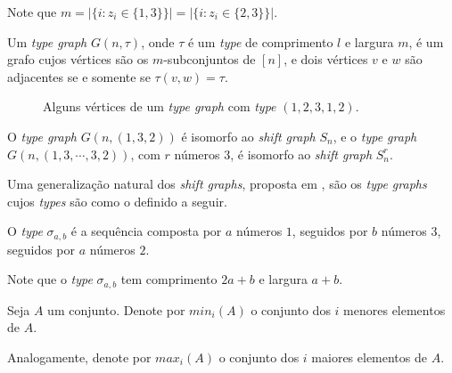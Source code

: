 Note que $m = |\{i : z_i \in \{1,3\}\}| = |\{i : z_i \in \{2,3\}\}|$.

\begin{definicao}
Um \textit{type graph} $G(n,\tau)$, onde $\tau$ é um \textit{type} de comprimento $l$ e largura $m$, é um grafo cujos vértices são os $m$-subconjuntos de $[n]$, e dois vértices $v$ e $w$ são adjacentes se e somente se $\tau(v,w) = \tau$.
\end{definicao}

\begin{figure}[H]
\centering
{}
\caption{Alguns vértices de um \textit{type graph} com \textit{type} $(1,2,3,1,2).$}
\label{fig:typegraphexample}
\end{figure}

O \textit{type graph} $G(n,(1,3,2))$ é isomorfo ao \textit{shift graph} $S_n$, e o \textit{type graph} $G(n, (1,3,\cdots,3,2))$, com $r$ números $3$, é isomorfo ao \textit{shift graph} $S_n^r$.

Uma generalização natural dos \textit{shift graphs}, proposta em \cite{avart2014generalized}, são os \textit{type graphs} cujos \textit{types} são como o definido a seguir.

\begin{definicao}
O \textit{type} $\sigma_{a,b}$ é a sequência composta por $a$ números $1$, seguidos por $b$ números $3$, seguidos por $a$ números $2$.
\end{definicao}

Note que o \textit{type} $\sigma_{a,b}$ tem comprimento $2a+b$ e largura $a+b$.

\begin{definicao}
Seja $A$ um conjunto. Denote por $min_i(A)$ o conjunto dos $i$ menores elementos de $A$.

Analogamente, denote por $max_i(A)$ o conjunto dos $i$ maiores elementos de $A$.
\end{definicao}

